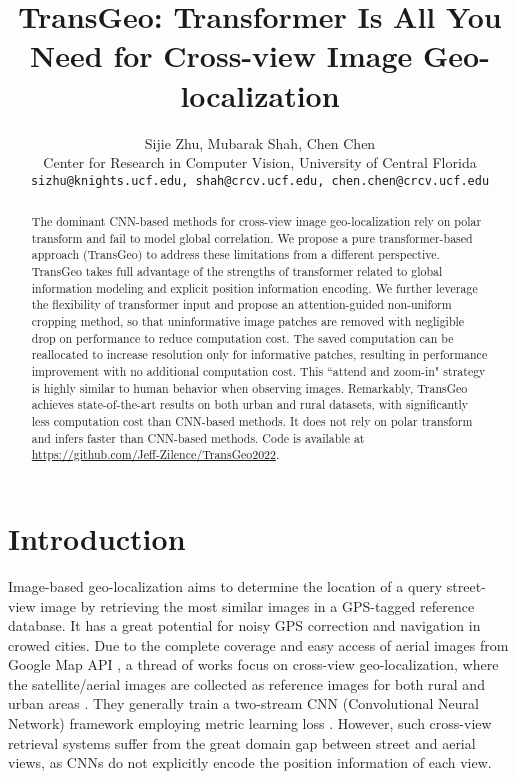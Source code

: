 \documentclass[10pt,twocolumn,letterpaper]{article}
\begin{document}
\title{TransGeo: Transformer Is All You Need for Cross-view Image Geo-localization}
\author{Sijie Zhu,  Mubarak Shah,  Chen Chen\\
Center for Research in Computer Vision, University of Central Florida\\
{\tt\small sizhu@knights.ucf.edu, shah@crcv.ucf.edu, chen.chen@crcv.ucf.edu}}
\maketitle

\begin{abstract}
The dominant CNN-based methods for cross-view image geo-localization rely on polar transform and fail to model global correlation. We propose a pure transformer-based approach (TransGeo) to address these limitations from a different perspective. TransGeo takes full advantage of the strengths of transformer related to global information modeling and explicit position information encoding. We further leverage the flexibility of transformer input and propose an attention-guided non-uniform cropping method, so that uninformative image patches are removed with negligible drop on performance to reduce computation cost. The saved computation can be reallocated to increase resolution only for informative patches, resulting in performance improvement with no additional computation cost. This ``attend and zoom-in" strategy is highly similar to human behavior when observing images. Remarkably, TransGeo achieves state-of-the-art results on both urban and rural datasets, with significantly less computation cost than CNN-based methods. It does not rely on polar transform and infers faster than CNN-based methods. Code is available at \url{https://github.com/Jeff-Zilence/TransGeo2022}.
\end{abstract}

\section{Introduction}
\label{sec:intro}
Image-based geo-localization aims to determine the location of a query street-view image by retrieving the most similar images in a GPS-tagged reference database. It has a great potential for noisy GPS correction \cite{brosh2019accurate,zamir2010accurate} and navigation \cite{mirowski2018learning,li2019cross} in crowed cities. Due to the complete coverage and easy access of aerial images from Google Map API \cite{Google_map}, a thread of works \cite{Vo,Chen,CVM,liu2019lending,SAFA,WACV,geocapsnet, shi2020looking, UCF} focus on cross-view geo-localization, where the satellite/aerial images are collected as reference images for both rural \cite{Zhai,liu2019lending} and urban areas \cite{Vo,zhu2021vigor}. They generally train a two-stream CNN (Convolutional Neural Network) framework employing metric learning loss \cite{CVM, WACV}. However, such cross-view retrieval systems suffer from the great domain gap between street  and aerial views, as CNNs do not explicitly encode the position information of each view. 
\end{document}
